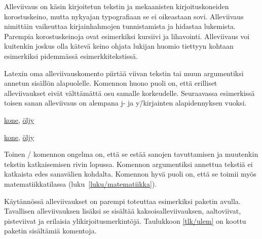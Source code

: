 Alleviivaus on käsin kirjoitetun tekstin ja mekaanisten
kirjoituskoneiden korostuskeino, mutta nykyajan typografiaan se ei
oikeastaan sovi. Alleviivaus nimittäin vaikeuttaa kirjainhahmojen
tunnistamista ja hidastaa lukemista. Parempia korostuskeinoja ovat
esimerkiksi kursiivi ja lihavointi. Alleviivaus voi kuitenkin joskus
olla kätevä keino ohjata lukijan huomio tiettyyn kohtaan esimerkiksi
pidemmässä esimerkkitekstissä.

Latexin oma alleviivauskomento  piirtää viivan
tekstin tai muun argumentiksi annetun sisällön alapuolelle. Komennon
huono puoli on, että erilliset alleviivaukset eivät välttämättä osu
samalle korkeudelle. Seuraavassa esimerkissä toisen sanan alleviivaus on
alempana j- ja y\=/kirjainten alapidennyksen vuoksi.

\begin{koodilohkosis}
\underline{kone}, \underline{öljy}
\end{koodilohkosis}

\begin{tulossis}
  \underline{kone}, \underline{öljy}
\end{tulossis}

\noindent
Toinen \-/ komennon ongelma on, että se estää sanojen
tavuttamisen ja muutenkin tekstin katkaisemisen rivin lopussa. Komennon
argumentiksi annettua tekstiä ei katkaista edes sanavälien kohdalta.
Komennon hyvä puoli on, että se toimii myös matematiikkatilassa
(luku~\ref{luku/matematiikka}).

Käytännössä alleviivaukset on parempi toteuttaa esimerkiksi paketin
 avulla. Tavallisen alleviivauksen lisäksi se sisältää
kaksoisalleviivauksen, aaltoviivat, pisteviivat ja erilaisia
ylikirjoitusmerkintöjä. Taulukkoon \ref{tlk/ulem} on koottu paketin
sisältämiä komentoja.


